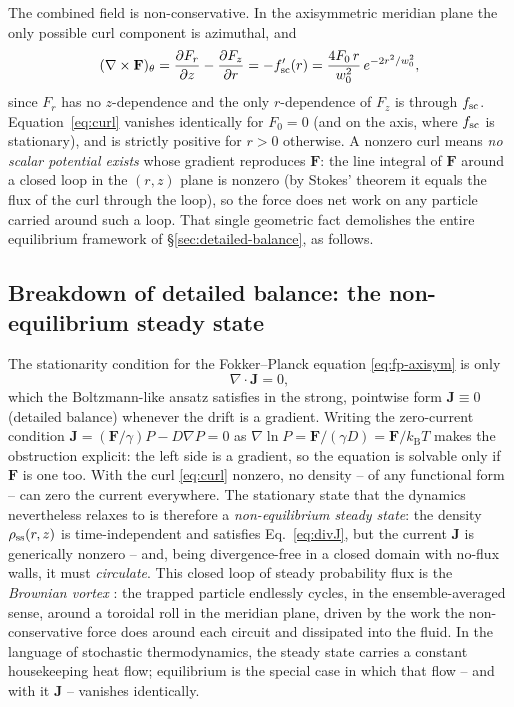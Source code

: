 \documentclass[11pt]{article}
\newcommand{\pdv}[2]{\dfrac{\partial #1}{\partial #2}}
\newcommand{\kB}{k_{\mathrm{B}}}
\begin{document}
The combined field is non-conservative. In the axisymmetric meridian plane the only possible curl component is azimuthal, and
\begin{equation}
(\nabla\times\mathbf{F})_\theta
= \pdv{F_r}{z} - \pdv{F_z}{r}
= -f_{\rm sc}'(r)
= \frac{4F_0\,r}{w_0^2}\,e^{-2r^2/w_0^2},
\label{eq:curl}
\end{equation}
since $F_r$ has no $z$-dependence and the only $r$-dependence of $F_z$ is through $f_{\rm sc}$. Equation~\eqref{eq:curl} vanishes identically for $F_0=0$ (and on the axis, where $f_{\rm sc}$ is stationary), and is strictly positive for $r>0$ otherwise. A nonzero curl means \emph{no scalar potential exists} whose gradient reproduces $\mathbf F$: the line integral of $\mathbf F$ around a closed loop in the $(r,z)$ plane is nonzero (by Stokes' theorem it equals the flux of the curl through the loop), so the force does net work on any particle carried around such a loop. That single geometric fact demolishes the entire equilibrium framework of \S\ref{sec:detailed-balance}, as follows.

\subsection{Breakdown of detailed balance: the non-equilibrium steady state}

The stationarity condition for the Fokker--Planck equation \eqref{eq:fp-axisym} is only
\begin{equation}
\nabla\cdot\mathbf{J} = 0,
\label{eq:divJ}
\end{equation}
which the Boltzmann-like ansatz satisfies in the strong, pointwise form $\mathbf J \equiv 0$ (detailed balance) whenever the drift is a gradient. Writing the zero-current condition $\mathbf J = (\mathbf F/\gamma)P - D\nabla P = 0$ as $\nabla \ln P = \mathbf F/(\gamma D) = \mathbf F/\kB T$ makes the obstruction explicit: the left side is a gradient, so the equation is solvable only if $\mathbf F$ is one too. With the curl \eqref{eq:curl} nonzero, no density -- of any functional form -- can zero the current everywhere. The stationary state that the dynamics nevertheless relaxes to is therefore a \emph{non-equilibrium steady state}: the density $\rho_{\rm ss}(r,z)$ is time-independent and satisfies Eq.~\eqref{eq:divJ}, but the current $\mathbf J$ is generically nonzero -- and, being divergence-free in a closed domain with no-flux walls, it must \emph{circulate}. This closed loop of steady probability flux is the \emph{Brownian vortex} \cite{Roichman2008,Sun2009}: the trapped particle endlessly cycles, in the ensemble-averaged sense, around a toroidal roll in the meridian plane, driven by the work the non-conservative force does around each circuit and dissipated into the fluid. In the language of stochastic thermodynamics, the steady state carries a constant housekeeping heat flow; equilibrium is the special case in which that flow -- and with it $\mathbf J$ -- vanishes identically.
\end{document}
